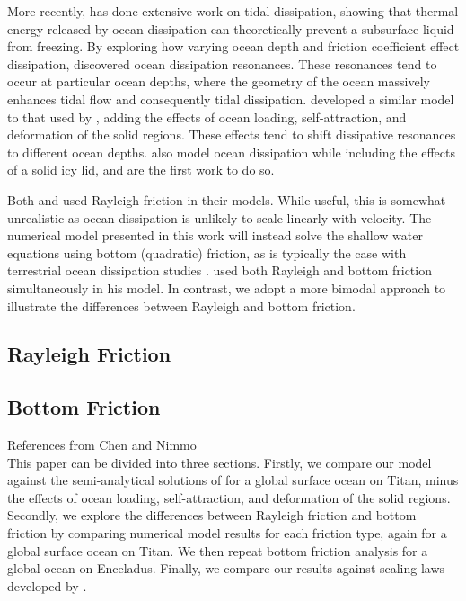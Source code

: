 More recently, \citet{tyler2008strong,tyler2009ocean,tyler2011tidal,tyler2014comparative} has done extensive work on tidal dissipation, showing that thermal energy released by ocean dissipation can theoretically prevent a subsurface liquid from freezing. By exploring how varying ocean depth and friction coefficient effect dissipation, \citet{tyler2011tidal} discovered ocean dissipation resonances. These resonances tend to occur at particular ocean depths, where the geometry of the ocean massively enhances tidal flow and consequently tidal dissipation. \citet{matsuyama2014tidal} developed a similar model to that used by \citet{tyler2011tidal}, adding the effects of ocean loading, self-attraction, and deformation of the solid regions. These effects tend to shift dissipative resonances to different ocean depths. \citet{kamata2015tidal} also model ocean dissipation while including the effects of a solid icy lid, and are the first work to do so.

Both \citet{tyler2011tidal} and \citet{matsuyama2014tidal} used Rayleigh friction in their models. While useful, this is somewhat unrealistic as ocean dissipation is unlikely to scale linearly with velocity. The numerical model presented in this work will instead solve the shallow water equations using bottom (quadratic) friction, as is typically the case with terrestrial ocean dissipation studies \citep{taylor1920tidal,jeffreys1921tidal,egbert2001estimates,jayne2001parameterizing}. \citet{sears1995tidal} used both Rayleigh and bottom friction simultaneously in his model. In contrast, we adopt a more bimodal approach to illustrate the differences between Rayleigh and bottom friction. 

\subsection{Rayleigh Friction}

\subsection{Bottom Friction}

References from Chen and Nimmo\\

This paper can be divided into three sections. Firstly, we compare our model against the semi-analytical solutions of \citet{matsuyama2014tidal} for a global surface ocean on Titan, minus the effects of ocean loading, self-attraction, and deformation of the solid regions. Secondly, we explore the differences between Rayleigh friction and bottom friction by comparing numerical model results for each friction type, again for a global surface ocean on Titan. We then repeat bottom friction analysis for a global ocean on Enceladus. Finally, we compare our results against scaling laws developed by \citep{chen2013tidal}.




